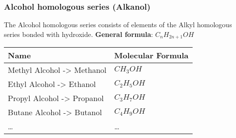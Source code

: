 \documentclass[11pt]{article}
\begin{document}
\subsubsection{Alcohol homologous series (Alkanol)}
\label{sec:org4a338af}
The Alcohol homologous series consists of elements of the Alkyl homologous series bonded with hydroxide.
\textbf{General formula}: \(C_nH_{2n+1}OH\)
\begin{center}
\begin{tabular}{ll}
Name & Molecular Formula\\
\hline
Methyl Alcohol -> Methanol & \(CH_3OH\)\\
Ethyl Alcohol -> Ethanol & \(C_2H_5OH\)\\
Propyl Alcohol -> Propanol & \(C_3H_7OH\)\\
Butane Alcohol -> Butanol & \(C_4H_9OH\)\\
\ldots{} & \ldots{}\\
\end{tabular}
\end{center}
\end{document}
